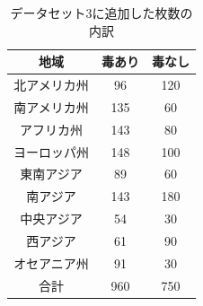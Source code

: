 \documentclass[a4paper, 11pt, titlepage]{jsarticle}
\begin{document}
\begin{table}[htb]
\centering
  \caption{データセット3に追加した枚数の内訳}
  \begin{tabular}{|c|c|c|}  \hline
    地域 & 毒あり & 毒なし \\ \hline \hline
    北アメリカ州 & 96 & 120 \\ \hline
    南アメリカ州 & 135 & 60 \\ \hline
    アフリカ州 & 143 & 80 \\ \hline
    ヨーロッパ州 & 148 & 100 \\ \hline
    東南アジア & 89 & 60 \\ \hline
    南アジア & 143 & 180 \\ \hline
    中央アジア & 54 & 30 \\ \hline
    西アジア & 61 & 90 \\ \hline
    オセアニア州 & 91 & 30 \\ \hline \hline
    合計 & 960 & 750 \\ \hline
  \end{tabular}
\end{table}
\end{document}

